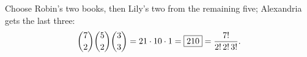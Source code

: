 Choose Robin's two books, then Lily's two from the remaining five; Alexandria gets the last three:
\[
\dbinom72\dbinom52\dbinom33=21\cdot10\cdot1=\boxed{210}=\dfrac{7!}{2!\,2!\,3!}.
\]
